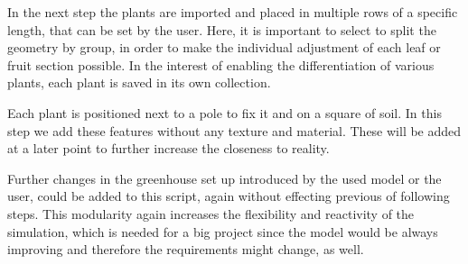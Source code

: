 In the next step the plants are imported and placed in multiple rows of a specific length, that can be set by the user. Here, it is important to select to split the geometry by group, in order to make the individual adjustment of each leaf or fruit section possible. In the interest of enabling the differentiation of various plants, each plant is saved in its own collection. 

Each plant is positioned next to a pole to fix it and on a square of soil. In this step we add these features without any texture and material. These will be added at a later point to further increase the closeness to reality. 

\vspace{5pt}

Further changes in the greenhouse set up introduced by the used model or the user, could be added to this script, again without effecting previous of following steps. This modularity again increases the flexibility and reactivity of the simulation, which is needed for a big project since the model would be always improving and therefore the requirements might change, as well. 